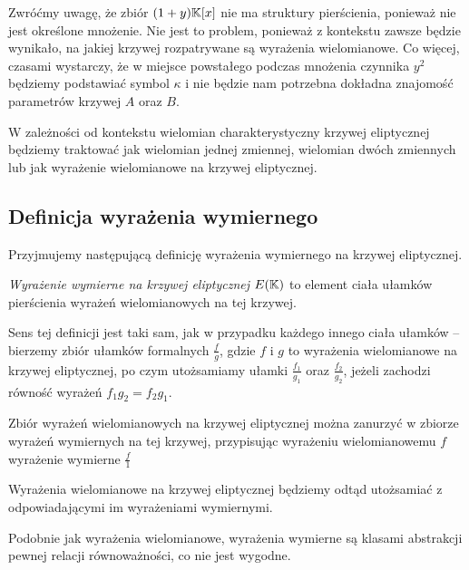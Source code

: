 Zwróćmy uwagę, że zbiór $(1 + y)\mathbb{K}[x]$ nie ma struktury pierścienia,
ponieważ nie jest określone mnożenie.
Nie jest to problem,
ponieważ z kontekstu zawsze będzie wynikało,
na jakiej krzywej rozpatrywane są wyrażenia wielomianowe.
Co więcej, czasami wystarczy,
że w miejsce powstałego podczas mnożenia czynnika $y^2$
będziemy podstawiać symbol $\kappa$
i nie będzie nam potrzebna dokładna znajomość parametrów krzywej $A$ oraz $B$.

\begin{remark}
W zależności od kontekstu wielomian charakterystyczny krzywej eliptycznej
będziemy traktować jak wielomian jednej zmiennej, wielomian dwóch zmiennych
lub jak wyrażenie wielomianowe na krzywej eliptycznej.
\end{remark}

\subsection*{Definicja wyrażenia wymiernego}

Przyjmujemy następującą definicję
wyrażenia wymiernego na krzywej eliptycznej.

\begin{definition}
\emph{Wyrażenie wymierne na krzywej eliptycznej $E(\mathbb{K})$}
to element ciała ułamków pierścienia wyrażeń wielomianowych na tej krzywej.
\end{definition}

Sens tej definicji jest taki sam,
jak w przypadku każdego innego ciała ułamków --
bierzemy zbiór ułamków formalnych $\frac{f}{g}$,
gdzie $f$ i $g$ to wyrażenia wielomianowe na krzywej eliptycznej,
po czym utożsamiamy ułamki $\frac{f_1}{g_1}$ oraz $\frac{f_2}{g_2}$,
jeżeli zachodzi równość wyrażeń $f_1g_2 = f_2g_1$.

\begin{fact}
Zbiór wyrażeń wielomianowych na krzywej eliptycznej
można zanurzyć w zbiorze wyrażeń wymiernych na tej krzywej,
przypisując wyrażeniu wielomianowemu $f$ wyrażenie wymierne $\frac{f}{1}$
\end{fact}

\begin{remark}
Wyrażenia wielomianowe na krzywej eliptycznej
będziemy odtąd utożsamiać z odpowiadającymi im wyrażeniami wymiernymi.
\end{remark}

Podobnie jak wyrażenia wielomianowe,
wyrażenia wymierne są klasami abstrakcji pewnej relacji równoważności,
co nie jest wygodne.

